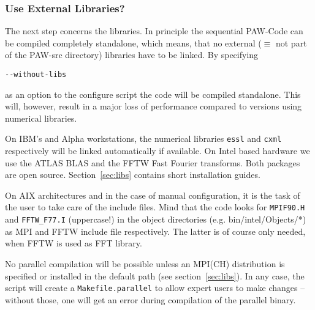 \documentclass[a4paper,10pt]{article}
\newcommand{\PAW}{\textsc{PAW}}
\begin{document}
\subsubsection*{Use External Libraries?}
\label{sub:libs}
The next step concerns the libraries.  In principle the sequential \PAW-Code
can be compiled completely standalone, which means, that no external ($\equiv$
not part of the \PAW-src directory) libraries have to be linked.  By specifying
\begin{verbatim}
--without-libs
\end{verbatim}
as an option to the configure script the code will be compiled standalone.
This will, however, result in a major loss of performance compared to versions
using numerical libraries.

On IBM's and Alpha workstations, the numerical libraries \texttt{essl} and
\texttt{cxml} respectively will be linked automatically if available.  On Intel
based hardware we use the \mbox{ATLAS} \mbox{BLAS} and the \mbox{FFTW} Fast
Fourier transforms. Both packages are open source.  Section~\ref{sec:libs}
contains short installation guides.

On AIX architectures and in the case of manual configuration, it is the task of
the user to take care of the include files.  Mind that the code looks for
\texttt{MPIF90.H} and \texttt{FFTW\_F77.I} (uppercase!) in the object directories
(e.g. bin/intel/Objects/*) as MPI and FFTW include file respectively.  The
latter is of course only needed, when FFTW is used as FFT library.

No parallel compilation will be possible unless an MPI(CH) distribution is
specified or installed in the default path (see section~\ref{sec:libs}).  In
any case, the script will create a \texttt{Makefile.parallel} to allow expert
users to make changes -- without those, one will get an error during
compilation of the parallel binary.  
\end{document}
